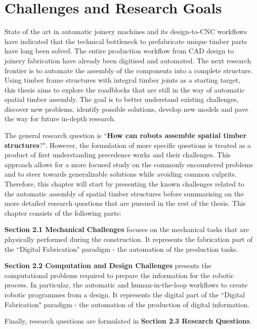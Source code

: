 \chapter{Challenges and Research Goals}
\label{chapter:challenges_and_research_goals}

State of the art in automatic joinery machines and its design-to-CNC workflows have indicated that the technical bottleneck to prefabricate unique timber parts have long been solved. The entire production workflow from CAD design to joinery fabrication have already been digitised and automated. The next research frontier is to automate the assembly of the components into a complete structure. Using timber frame structures with integral timber joints as a starting target, this thesis aims to explore the roadblocks that are still in the way of automatic spatial timber assembly. The goal is to better understand existing challenges, discover new problems, identify possible solutions, develop new models and pave the way for future in-depth research.

The general research question is ``\textbf{How can robots assemble spatial timber structures}?". However, the formulation of more specific questions is treated as a product of first understanding precedence works and their challenges. This approach allows for a more focused study on the commonly encountered problems and to steer towards generalizable solutions while avoiding common culprits. Therefore, this chapter will start by presenting the known challenges related to the automatic assembly of spatial timber structures before summarising on the more detailed research questions that are pursued in the rest of the thesis. This chapter consists of the following parts: 

\textbf{Section 2.1 Mechanical Challenges }focuses on the mechanical tasks that are physically performed during the construction. It represents the fabrication part of the ``Digital Fabrication" paradigm - the automation of the production tasks.

\textbf{Section 2.2 Computation and Design Challenges} presents the computational problems required to prepare the information for the robotic process. In particular, the automatic and human-in-the-loop workflows to create robotic programmes from a design. It represents the digital part of the ``Digital Fabrication" paradigm - the automation of the production of digital information.

Finally, research questions are formulated in \textbf{Section 2.3 Research Questions}. 

